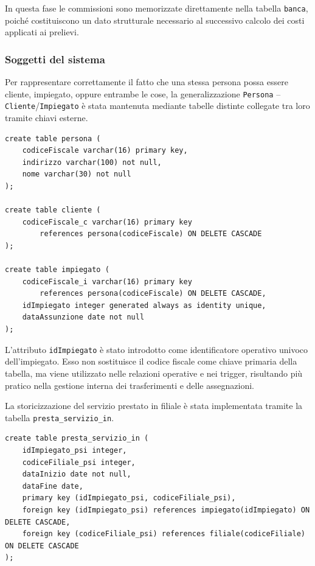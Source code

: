 In questa fase le commissioni sono memorizzate direttamente nella tabella \texttt{banca}, poiché costituiscono un dato strutturale necessario al successivo calcolo dei costi applicati ai prelievi.

\subsubsection{Soggetti del sistema}
Per rappresentare correttamente il fatto che una stessa persona possa essere cliente, impiegato, oppure entrambe le cose, la generalizzazione \texttt{Persona} -- \texttt{Cliente}/\texttt{Impiegato} è stata mantenuta mediante tabelle distinte collegate tra loro tramite chiavi esterne.

\begin{lstlisting}[caption={Tabelle persona, cliente e impiegato}]
create table persona (
    codiceFiscale varchar(16) primary key,
    indirizzo varchar(100) not null,
    nome varchar(30) not null
);

create table cliente (
    codiceFiscale_c varchar(16) primary key
        references persona(codiceFiscale) ON DELETE CASCADE
);

create table impiegato (
    codiceFiscale_i varchar(16) primary key
        references persona(codiceFiscale) ON DELETE CASCADE,
    idImpiegato integer generated always as identity unique,
    dataAssunzione date not null
);
\end{lstlisting}

L'attributo \texttt{idImpiegato} è stato introdotto come identificatore operativo univoco dell'impiegato. Esso non sostituisce il codice fiscale come chiave primaria della tabella, ma viene utilizzato nelle relazioni operative e nei trigger, risultando più pratico nella gestione interna dei trasferimenti e delle assegnazioni.

La storicizzazione del servizio prestato in filiale è stata implementata tramite la tabella \texttt{presta\_servizio\_in}.

\begin{lstlisting}[caption={Tabella presta\_servizio\_in}]
create table presta_servizio_in (
    idImpiegato_psi integer,
    codiceFiliale_psi integer,
    dataInizio date not null,
    dataFine date,
    primary key (idImpiegato_psi, codiceFiliale_psi),
    foreign key (idImpiegato_psi) references impiegato(idImpiegato) ON DELETE CASCADE,
    foreign key (codiceFiliale_psi) references filiale(codiceFiliale) ON DELETE CASCADE
);
\end{lstlisting}

